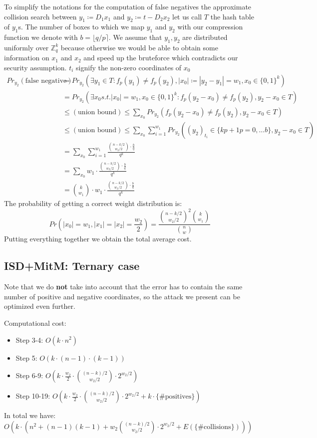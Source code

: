 \documentclass[12pt]{article}
\newcommand{\ZZ}{\mathbb{Z}}
\begin{document}
To simplify the notations for the computation of false negatives the approximate collision search between $y_1 \coloneqq D_1x_1$ and $y_2 \coloneqq t-D_2x_2$ let us call $T$ the hash table of $y_1$s. The number of boxes to which we map $y_1$ and $y_2$ with our compression function we denote with $b = \lfloor q/p \rceil$. We assume that $y_1, y_2$ are distributed uniformly over $\ZZ_q^{k}$ because otherwise we would be able to obtain some information on $x_1$ and $x_2$ and speed up the bruteforce which contradicts our security assumption. $t_i$ signify the non-zero coordinates of $x_0$
\[
\begin{split}
    Pr_{y_2}(\text{false negative}) & = Pr_{y_2}(\exists y_1 \in T: f_p(y_1) \neq f_p(y_2), |x_0| \coloneqq |y_2 - y_1| = w_1, x_0 \in \{0,1\}^{k}) \\
    & = Pr_{y_2}(\exists x_0 s.t. |x_0| = w_1, x_0 \in\{0,1\}^{k}: f_p(y_2 - x_0) \neq f_p(y_2), y_2 - x_0 \in T) \\
    & \leq (\text{union bound}) \leq \sum_{x_0} Pr_{y_2}(f_p(y_2 - x_0) \neq f_p(y_2), y_2 - x_0 \in T) \\
    & \leq (\text{union bound}) \leq \sum_{x_0} \sum_{i = 1}^{w_1} Pr_{y_2}((y_2)_{t_i} \in \{kp+1 p=0, \dots b\}, y_2 - x_0 \in T) \\
    & = \sum_{x_0} \sum_{i = 1}^{w_1} \frac{\binom{n-k/2}{w_2/2} \cdot \frac{b}{q}}{q^k} \\
    & = \sum_{x_0} w_1 \cdot \frac{\binom{n-k/2}{w_2/2} \cdot \frac{b}{q}}{q^k} \\
    & = \binom{k}{w_1} \cdot w_1 \cdot \frac{\binom{n-k/2}{w_2/2} \cdot \frac{b}{q}}{q^k}
\end{split}
\]
The probability of getting a correct weight distribution is:
\[
    Pr(|x_0| = w_1, |x_1| = |x_2| = \frac{w_2}{2}) = \frac{\binom{n-k/2}{w_2/2}^{2}\binom{k}{w_1}}{\binom{n}{w}}
\]
Putting everything together we obtain the total average cost.

\subsection{ISD+MitM: Ternary case}
Note that we do \textbf{not} take into account that the error has to contain the same number of positive and negative coordinates, so the attack we present can be optimized even further.
 
Computational cost:
\begin{itemize}
    \item Step 3-4: $O(k \cdot n^2)$
    \item Step 5: $O(k \cdot (n-1) \cdot (k-1))$
    \item Step 6-9: $O(k \cdot \frac{w_2}{2} \cdot \binom{(n-k)/2}{w_2/2} \cdot 2^{w_2/2})$
    \item Step 10-19: $O(k \cdot \frac{w_2}{2} \cdot \binom{(n-k)/2}{w_2/2} \cdot 2^{w_2/2} + k \cdot \{\text{\# positives}\})$
\end{itemize}
In total we have: $O(k \cdot (n^2 + (n-1)(k-1) + w_2\binom{(n-k)/2}{w_2/2} \cdot 2^{w_2/2} + E(\{\text{\# collisions}\})))$
\end{document}
